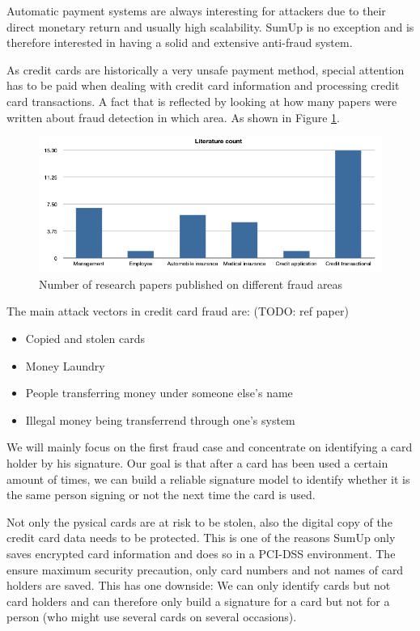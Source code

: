 \documentclass[a4paper, oneside]{csthesis}
\begin{document}
Automatic payment systems are always interesting for attackers due to their direct monetary return and usually high scalability. SumUp is no exception and is therefore interested in having a solid and extensive anti-fraud system.

As credit cards are historically a very unsafe payment method, special attention has to be paid when dealing with credit card information and processing credit card transactions. A fact that is reflected by looking at how many papers were written about fraud detection in which area. As shown in Figure \ref{fig:fraud-literature-count}.


\begin{figure}[tb]
    \begin{center}
        \includegraphics[width=\textwidth]{figures/fraud-literature-count}
    \end{center}
    \caption{Number of research papers published on different fraud areas}
    \label{fig:fraud-literature-count}
\end{figure}

The main attack vectors in credit card fraud are: (TODO: ref paper)

\begin{itemize}
    \item Copied and stolen cards
    \item Money Laundry
    \item People transferring money under someone else's name
    \item Illegal money being transferrend through one's system
\end{itemize}

We will mainly focus on the first fraud case and concentrate on identifying a card holder by his signature. Our goal is that after a card has been used a certain amount of times, we can build a reliable signature model to identify whether it is the same person signing or not the next time the card is used.

Not only the pysical cards are at risk to be stolen, also the digital copy of the credit card data needs to be protected. This is one of the reasons SumUp only saves encrypted card information and does so in a PCI-DSS environment. The ensure maximum security precaution, only card numbers and not names of card holders are saved. This has one downside: We can only identify cards but not card holders and can therefore only build a signature for a card but not for a person (who might use several cards on several occasions).
\end{document}
